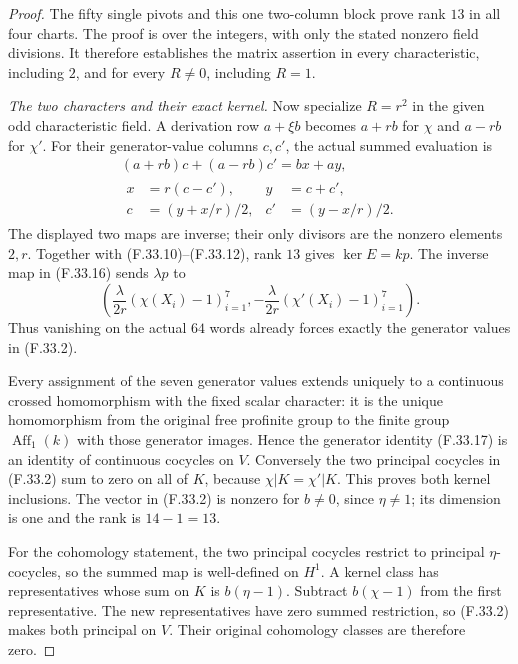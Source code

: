 \begin{proof}
The fifty single pivots and this one
two-column block prove rank $13$ in
all four charts. The proof is over
the integers, with only the stated
nonzero field divisions. It therefore
establishes the matrix assertion in
every characteristic, including $2$,
and for every $R\ne0$, including $R=1$.

\emph{The two characters and their exact kernel.}
Now specialize $R=r^2$ in the given odd
characteristic field. A derivation row
$a+\xi b$ becomes $a+rb$ for $\chi$
and $a-rb$ for $\chi'$.
For their generator-value columns $c,c'$,
the actual summed evaluation is
\[
 \begin{gathered}
 (a+rb)c+(a-rb)c'=bx+ay,\\
 \begin{aligned}
 x&=r(c-c'),&y&=c+c',\\
 c&=(y+x/r)/2,&c'&=(y-x/r)/2.
 \end{aligned}
 \end{gathered}                                                \tag{F.33.16}
\]
The displayed two maps are inverse;
their only divisors are the nonzero
elements $2,r$. Together with
(F.33.10)--(F.33.12), rank $13$ gives
$\ker E=kp$. The inverse map in
(F.33.16) sends $\lambda p$ to
\[
 \left(\frac{\lambda}{2r}(\chi(X_i)-1)_{i=1}^7,
       -\frac{\lambda}{2r}(\chi'(X_i)-1)_{i=1}^7\right).
                                                               \tag{F.33.17}
\]
Thus vanishing on the actual $64$ words
already forces exactly the generator
values in (F.33.2).

Every assignment of the seven generator
values extends uniquely to a continuous
crossed homomorphism with the fixed
scalar character: it is the unique
homomorphism from the original free
profinite group to the finite group
$\operatorname{Aff}_1(k)$ with those
generator images. Hence the generator
identity (F.33.17) is an identity of
continuous cocycles on $V$.
Conversely the two principal cocycles
in (F.33.2) sum to zero on all of $K$,
because $\chi|K=\chi'|K$.
This proves both kernel inclusions.
The vector in (F.33.2) is nonzero for
$b\ne0$, since $\eta\ne1$; its dimension
is one and the rank is $14-1=13$.

For the cohomology statement, the two
principal cocycles restrict to principal
$\eta$-cocycles, so the summed map is
well-defined on $H^1$. A kernel class
has representatives whose sum on $K$
is $b(\eta-1)$. Subtract $b(\chi-1)$
from the first representative. The new
representatives have zero summed
restriction, so (F.33.2) makes both
principal on $V$. Their original
cohomology classes are therefore zero.


\end{proof}
